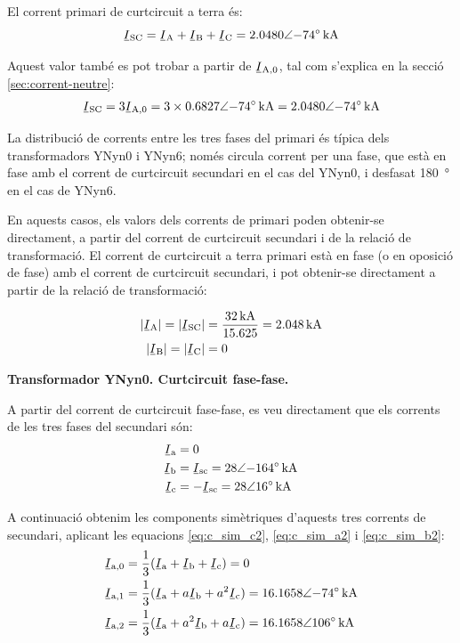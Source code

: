 \begin{exemple}[\CCasimSecTrafo{}]
    El corrent primari de curtcircuit a terra és:
    \[
        \cmplx{I}\ped{SC} = \cmplx{I}\ped{A} + \cmplx{I}\ped{B} + \cmplx{I}\ped{C} = \complexqty{2,0480:-74}{kA}
    \]

    Aquest valor també es pot trobar a partir de $\cmplx{I}\ped{A,0}$, tal com s'explica en la secció \vref{sec:corrent-neutre}:
       \[
        \cmplx{I}\ped{SC} = 3 \cmplx{I}\ped{A,0} = 3 \times \complexqty{0,6827:-74}{kA} = \complexqty{2,0480:-74}{kA}
    \]

    La distribució de corrents entre les tres fases del primari és típica dels transformadors YNyn0 i YNyn6; només circula corrent per una fase, que està en fase amb el corrent de curtcircuit secundari en el cas del YNyn0, i desfasat \qty{180}{\degree} en el cas de YNyn6.

    En aquests casos, els valors dels corrents de primari poden obtenir-se directament, a partir del corrent de curtcircuit secundari i de la relació de transformació. El corrent de curtcircuit a terra primari està en fase (o en oposició de fase) amb el corrent de curtcircuit secundari, i pot obtenir-se directament a partir de la relació de transformació:
    
    \begin{align*}
        |\cmplx{I}\ped{A}|  = |\cmplx{I}\ped{SC}| &= \frac{\qty{32}{kA}}{\num{15,625}} = \qty{2,048}{kA} \\
        |\cmplx{I}\ped{B}| = |\cmplx{I}\ped{C}| &=  0
    \end{align*}


    \textbf{ Transformador YNyn0. Curtcircuit fase-fase.}

    \begin{center}
       
    \end{center}

    A partir del corrent de curtcircuit fase-fase, es veu directament que els corrents de les tres fases del secundari són:
    \begin{align*}
        \cmplx{I}\ped{a} &= 0  \\
        \cmplx{I}\ped{b} &= \cmplx{I}\ped{sc} = \complexqty{28:-164}{kA}  \\
        \cmplx{I}\ped{c} &= -\cmplx{I}\ped{sc} = \complexqty{28:16}{kA}
    \end{align*}

    A continuació obtenim les components simètriques d'aquests tres corrents de secundari, aplicant les equacions \eqref{eq:c_sim_c2}, \eqref{eq:c_sim_a2} i \eqref{eq:c_sim_b2}:
    \begin{align*}
        \cmplx{I}\ped{a,0} &= \frac{1}{3} (\cmplx{I}\ped{a} + \cmplx{I}\ped{b} +
        \cmplx{I}\ped{c}) = 0 \\
        \cmplx{I}\ped{a,1} &= \frac{1}{3} (\cmplx{I}\ped{a} + a \cmplx{I}\ped{b} +
         a^2 \cmplx{I}\ped{c}) = \complexqty{16,1658:-74}{kA}  \\
        \cmplx{I}\ped{a,2} &= \frac{1}{3} (\cmplx{I}\ped{a} + a^2 \cmplx{I}\ped{b} +
         a \cmplx{I}\ped{c}) = \complexqty{16,1658:106}{kA}
    \end{align*}


\end{exemple}

